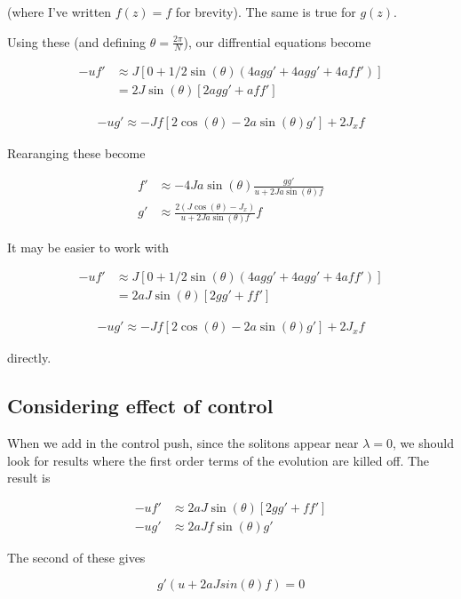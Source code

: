 \documentclass{article}
\begin{document}
(where I've written $f(z) = f$ for brevity). The same is true for $g(z)$.

Using these (and defining $\theta = \frac{2\pi}{N}$), our diffrential equations become

\begin{align*}
    -uf' &\approx J[0 +1/2\sin(\theta)(4agg' + 4agg' + 4aff')] \\
            &= 2J\sin(\theta)[2agg' + aff']
\end{align*}

\begin{align*}
    -ug' \approx -Jf[2\cos(\theta) - 2a\sin(\theta)g'] + 2J_xf
\end{align*}

Rearanging these become

\begin{align*}
    f' &\approx -4Ja\sin(\theta)\frac{gg'}{u + 2Ja\sin(\theta)f} \\
    g' &\approx \frac{2(J\cos(\theta) - J_x)}{u + 2Ja\sin(\theta)f}f
\end{align*}

It may be easier to work with 

\begin{align*}
    -uf' &\approx J[0 +1/2\sin(\theta)(4agg' + 4agg' + 4aff')] \\
            &= 2aJ\sin(\theta)[2gg' + ff']
\end{align*}

\begin{align*}
    -ug' \approx -Jf[2\cos(\theta) - 2a\sin(\theta)g'] + 2J_xf
\end{align*}

directly.

\subsection{Considering effect of control}

When we add in the control push, since the solitons appear near $\lambda = 0$, we should look for results where the first order terms of the evolution are killed off.
The result is 

\begin{align*}
    -uf' &\approx 2aJ\sin(\theta)[2gg' + ff'] \\
     -ug'&\approx 2aJf\sin(\theta)g'
\end{align*}

The second of these gives

\[
g'(u+2aJsin(\theta)f) = 0
\]
\end{document}
